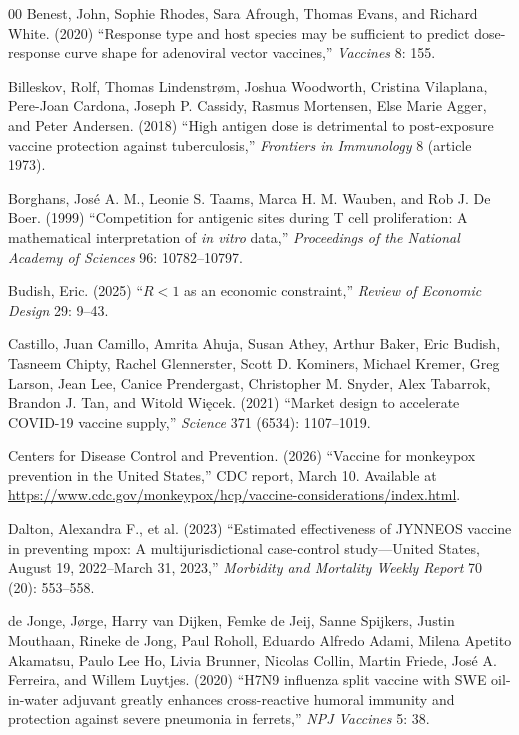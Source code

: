 \documentclass[12pt]{article}
\newcommand{\Wiecek}{Wi\k{e}cek}
\begin{document}
\begin{thebibliography}{00}
Benest, John, Sophie Rhodes, Sara Afrough, Thomas Evans, and Richard
White. (2020) ``Response type and host species may be sufficient to
predict dose-response curve shape for adenoviral vector vaccines,''
{\em Vaccines} 8: 155.

Billeskov, Rolf, Thomas Lindenstr\o{}m, Joshua Woodworth, Cristina
Vilaplana, Pere-Joan Cardona, Joseph P. Cassidy, Rasmus Mortensen,
Else Marie Agger, and Peter Andersen. (2018) ``High antigen dose is
detrimental to post-exposure vaccine protection against
tuberculosis,'' {\em Frontiers in Immunology} 8 (article 1973).

Borghans, Jos\'{e} A. M., Leonie S. Taams, Marca H. M. Wauben, and Rob
J. De Boer. (1999) ``Competition for antigenic sites during T cell
proliferation: A mathematical interpretation of {\em in vitro} data,''
{\em Proceedings of the National Academy of Sciences} 96:
10782--10797.

Budish, Eric. (2025) ``$R < 1$ as an economic constraint,''
{\em Review of Economic Design} 29: 9--43.

Castillo, Juan Camillo, Amrita Ahuja, Susan Athey, Arthur Baker, Eric
Budish, Tasneem Chipty, Rachel Glennerster, Scott D. Kominers, Michael
Kremer, Greg Larson, Jean Lee, Canice Prendergast, Christopher
M. Snyder, Alex Tabarrok, Brandon J. Tan, and Witold \Wiecek. (2021)
``Market design to accelerate COVID-19 vaccine supply,'' {\em Science}
371 (6534): 1107--1019.

Centers for Disease Control and Prevention. (2026) ``Vaccine for
monkeypox prevention in the United States,'' CDC report, March
10. Available at
\url{https://www.cdc.gov/monkeypox/hcp/vaccine-considerations/index.html}.

Dalton, Alexandra F., et al. (2023) ``Estimated effectiveness
of JYNNEOS vaccine in preventing mpox: A multijurisdictional
case-control study---United States, August 19, 2022--March 31, 2023,''
{\em Morbidity and Mortality Weekly Report} 70 (20): 553--558.

de Jonge, J{\o}rge, Harry van Dijken, Femke de Jeij, Sanne Spijkers,
Justin Mouthaan, Rineke de Jong, Paul Roholl, Eduardo Alfredo Adami,
Milena Apetito Akamatsu, Paulo Lee Ho, Livia Brunner, Nicolas Collin,
Martin Friede, Jos\'{e} A. Ferreira, and Willem Luytjes. (2020) ``H7N9
influenza split vaccine with SWE oil-in-water adjuvant greatly
enhances cross-reactive humoral immunity and protection against severe
pneumonia in ferrets,'' {\em NPJ Vaccines} 5: 38.


\end{thebibliography}
\end{document}
